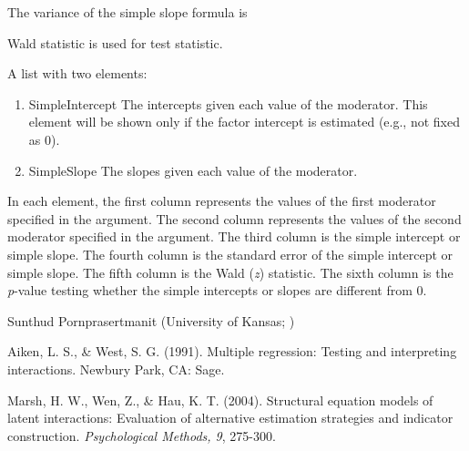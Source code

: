 \documentclass[a4paper]{book}
\begin{document}
\begin{Details}
The variance of the simple slope formula is 

Wald statistic is used for test statistic.
\end{Details}
%
\begin{Value}
A list with two elements:
\begin{enumerate}

\item SimpleIntercept The intercepts given each value of the moderator. This element will be shown only if the factor intercept is estimated (e.g., not fixed as 0).
\item SimpleSlope The slopes given each value of the moderator. 

\end{enumerate}

In each element, the first column represents the values of the first moderator specified in the  argument. The second column represents the values of the second moderator specified in the  argument. The third column is the simple intercept or simple slope. The fourth column is the standard error of the simple intercept or simple slope. The fifth column is the Wald (\emph{z}) statistic. The sixth column is the \emph{p}-value testing whether the simple intercepts or slopes are different from 0.
\end{Value}
%
\begin{Author}\relax
Sunthud Pornprasertmanit (University of Kansas; )
\end{Author}
%
\begin{References}\relax
Aiken, L. S., \& West, S. G. (1991). Multiple regression: Testing and interpreting interactions. Newbury Park, CA: Sage.

Marsh, H. W., Wen, Z., \& Hau, K. T. (2004). Structural equation models of latent interactions: Evaluation of alternative estimation strategies and indicator construction. \emph{Psychological Methods, 9}, 275-300.
\end{References}
%
\end{document}
